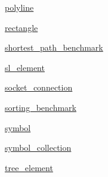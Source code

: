 \begin{DoxyCompactItemize}
 \hyperlink{namespacebridges_1_1polyline}{polyline}
\item 
 \hyperlink{namespacebridges_1_1rectangle}{rectangle}
\item 
 \hyperlink{namespacebridges_1_1shortest__path__benchmark}{shortest\+\_\+path\+\_\+benchmark}
\item 
 \hyperlink{namespacebridges_1_1sl__element}{sl\+\_\+element}
\item 
 \hyperlink{namespacebridges_1_1socket__connection}{socket\+\_\+connection}
\item 
 \hyperlink{namespacebridges_1_1sorting__benchmark}{sorting\+\_\+benchmark}
\item 
 \hyperlink{namespacebridges_1_1symbol}{symbol}
\item 
 \hyperlink{namespacebridges_1_1symbol__collection}{symbol\+\_\+collection}
\item 
 \hyperlink{namespacebridges_1_1tree__element}{tree\+\_\+element}
\end{DoxyCompactItemize}
